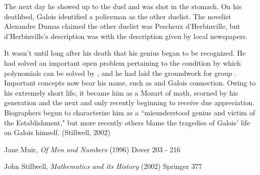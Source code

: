 \documentclass[12pt]{article}
\begin{document}
The next day he showed up to the duel and was shot in the stomach. On his deathbed, Galois identified a policeman as the other duelist. The novelist Alexandre Dumas claimed the other duelist was Pescheux d'Herbinville, but d'Herbinville's description was  with the description given by local newspapers.

It wasn't until long after his death that his genius began to be recognized. He had solved an important open problem pertaining to the condition by which polynomials can be solved by , and he had laid the groundwork for group . Important  concepts now bear his name, such as  and Galois connection. Owing to his extremely short life, it became  him as a Mozart of math, scorned by his generation and the next and only recently beginning to receive due appreciation. Biographers begun to characterize him as a ``misunderstood genius and victim of the Establishment," but more recently others blame the tragedies of Galois' life on Galois himself. (Stillwell, 2002)

Jane Muir, {\it Of Men and Numbers} (1996) Dover 203 - 216

John Stillwell, {\it Mathematics and its History} (2002) Springer 377
\end{document}
